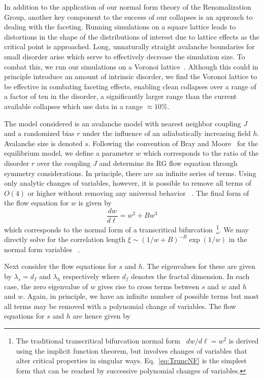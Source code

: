 \documentclass[reprint,amsmath,amssymb,aps,floatfix]{revtex4-1}
\begin{document}
%
In addition to the application of our normal form theory of the Renomalization Group, another key component to the success of our collapses is an approach to dealing with the faceting. Running simulations on a square lattice leads to distortions in the shape of the distributions of interest due to lattice effects as the critical point is approached. Long, unnaturally straight avalanche boundaries for small disorder arise which serve to effectively decrease the simulation size. To combat this, we run our simulations on a Voronoi lattice~\cite[Section~\ref{supp-app:sims}]{RFIM2Dsupp}.  Although this could in principle introduce an amount of intrinsic disorder, we find the Voronoi lattice to be effective in combating faceting effects, enabling clean collapses over a range of a factor of ten in the disorder, a significantly larger range than the current available collapses which use data in a range $\approx 10\%$.\par
%
The model considered is an avalanche model with nearest neighbor coupling $J$ and a randomized bias $r$ under the influence of an adiabatically increasing field $h$. Avalanche size is denoted $s$. Following the convention of Bray and Moore~\cite{BrayMoore85} for the equilibrium model, we define a parameter $w$ which corresponds to the ratio of the disorder $r$ over the coupling $J$ and determine its RG flow equation through symmetry considerations. In principle, there are an infinite series of terms. Using only analytic changes of variables, however, it is possible to remove all terms of $O(4)$ or higher without removing any universal behavior ~\cite[Section~\ref{supp-app:normalform}]{RFIM2Dsupp}. The final form of the flow equation for $w$ is given by 
%
\begin{equation}
	\label{eq:TruncNF}
	\frac{dw}{d\ell}=w^2+B w^3
\end{equation}
\noindent which corresponds to the normal form of a transcritical bifurcation~\footnote{The traditional transcritical bifurcation normal form~\cite{Strogatz14} $dw/d\ell = w^2$ is derived using the implicit function theorem, but involves changes of variables that alter critical properties in singular ways. Eq.~\ref{eq:TruncNF} is the simplest form that can be reached by successive polynomial changes of variables.}. We may directly solve for the correlation length $\xi\sim(1/w + B)^{-B}\exp(1/w)$ in the normal form variables ~\cite[Section~\ref{supp-app:correlation}]{RFIM2Dsupp}.\par
%
Next consider the flow equations for $s$ and $h$. The eigenvalues for these are given by $\lambda_s=d_f$ and $\lambda_h$ respectively where $d_f$ denotes the fractal dimension. In each case, the zero eigenvalue of $w$ gives rise to cross terms between $s$ and $w$ and $h$ and $w$. Again, in principle, we have an infinite number of possible terms but most all terms may be removed with a polynomial change of variables.   The flow equations for $s$ and $h$ are hence given by
\end{document}
